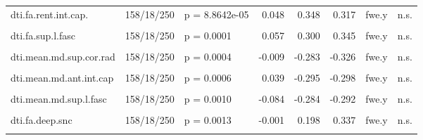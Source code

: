 \documentclass[
  table]{article}
\begin{document}
\begin{landscape}
\begin{table}
\begin{tabular}[t]{lllrrrll}
dti.fa.rent.int.cap. & 158/18/250 & p = 8.8642e-05 & 0.048 & 0.348 & 0.317 & fwe.y & n.s.\\
\addlinespace
\cellcolor{gray!22}{dti.mean.md.deep.snc} & \cellcolor{gray!22}{158/18/250} & \cellcolor{gray!22}{p = 0.0001} & \cellcolor{gray!22}{0.048} & \cellcolor{gray!22}{-0.255} & \cellcolor{gray!22}{-0.377} & \cellcolor{gray!22}{fwe.y} & \cellcolor{gray!22}{fwe.x}\\
dti.fa.sup.l.fasc & 158/18/250 & p = 0.0001 & 0.057 & 0.300 & 0.345 & fwe.y & n.s.\\
\cellcolor{gray!22}{dti.fa.ant.int.cap} & \cellcolor{gray!22}{158/18/250} & \cellcolor{gray!22}{p = 0.0003} & \cellcolor{gray!22}{-0.025} & \cellcolor{gray!22}{0.308} & \cellcolor{gray!22}{0.314} & \cellcolor{gray!22}{fwe.y} & \cellcolor{gray!22}{n.s.}\\
dti.mean.md.sup.cor.rad & 158/18/250 & p = 0.0004 & -0.009 & -0.283 & -0.326 & fwe.y & n.s.\\
\cellcolor{gray!22}{dti.fa.fornixlravg} & \cellcolor{gray!22}{158/18/250} & \cellcolor{gray!22}{p = 0.0004} & \cellcolor{gray!22}{-0.068} & \cellcolor{gray!22}{0.244} & \cellcolor{gray!22}{0.345} & \cellcolor{gray!22}{fwe.y} & \cellcolor{gray!22}{n.s.}\\
\addlinespace
dti.mean.md.ant.int.cap & 158/18/250 & p = 0.0006 & 0.039 & -0.295 & -0.298 & fwe.y & n.s.\\
\cellcolor{gray!22}{dti.mean.md.sup.frnt.occ.fasc} & \cellcolor{gray!22}{158/18/250} & \cellcolor{gray!22}{p = 0.0008} & \cellcolor{gray!22}{0.062} & \cellcolor{gray!22}{-0.265} & \cellcolor{gray!22}{-0.310} & \cellcolor{gray!22}{fwe.y} & \cellcolor{gray!22}{n.s.}\\
dti.mean.md.sup.l.fasc & 158/18/250 & p = 0.0010 & -0.084 & -0.284 & -0.292 & fwe.y & n.s.\\
\cellcolor{gray!22}{dti.mean.md.fornixlravg} & \cellcolor{gray!22}{158/18/250} & \cellcolor{gray!22}{p = 0.0011} & \cellcolor{gray!22}{0.033} & \cellcolor{gray!22}{-0.220} & \cellcolor{gray!22}{-0.329} & \cellcolor{gray!22}{fwe.y} & \cellcolor{gray!22}{n.s.}\\
dti.fa.deep.snc & 158/18/250 & p = 0.0013 & -0.001 & 0.198 & 0.337 & fwe.y & n.s.\\
\addlinespace
\cellcolor{gray!22}{dti.mean.md.post.int.cap} & \cellcolor{gray!22}{158/18/250} & \cellcolor{gray!22}{p = 0.0024} & \cellcolor{gray!22}{0.001} & \cellcolor{gray!22}{-0.245} & \cellcolor{gray!22}{-0.289} & \cellcolor{gray!22}{fdr.y} & \cellcolor{gray!22}{n.s.}\\

\end{tabular}
\end{table}
\end{landscape}
\end{document}
